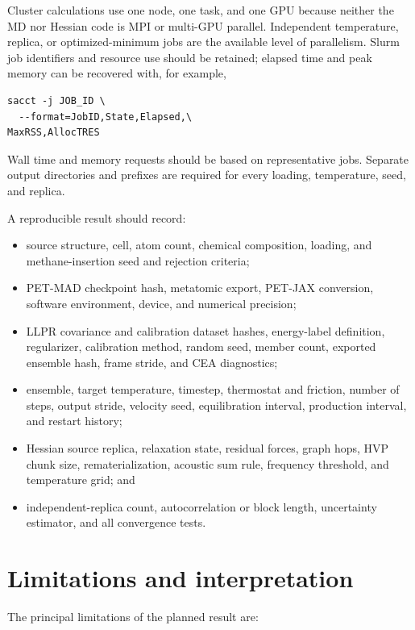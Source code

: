 \documentclass[10pt,a4paper,twocolumn]{article}
\begin{document}
Cluster calculations use one node, one task, and one GPU because neither the MD
nor Hessian code is MPI or multi-GPU parallel. Independent temperature,
replica, or optimized-minimum jobs are the available level of parallelism.
Slurm job identifiers and resource use should be retained; elapsed time and peak
memory can be recovered with, for example,
\begin{verbatim}
sacct -j JOB_ID \
  --format=JobID,State,Elapsed,\
MaxRSS,AllocTRES
\end{verbatim}
Wall time and memory requests should be based on representative jobs.
Separate output directories and
prefixes are required for every loading, temperature, seed, and replica.

A reproducible result should record:

\begin{itemize}
  \item source structure, cell, atom count, chemical composition, loading, and
        methane-insertion seed and rejection criteria;
  \item PET-MAD checkpoint hash, metatomic export, PET-JAX conversion, software
        environment, device, and numerical precision;
  \item LLPR covariance and calibration dataset hashes, energy-label
        definition, regularizer, calibration method, random seed, member
        count, exported ensemble hash, frame stride, and CEA diagnostics;
  \item ensemble, target temperature, timestep, thermostat and friction,
        number of steps, output stride, velocity seed, equilibration interval,
        production interval, and restart history;
  \item Hessian source replica, relaxation state, residual forces, graph hops,
        HVP chunk size, rematerialization, acoustic sum rule, frequency
        threshold, and temperature grid; and
  \item independent-replica count, autocorrelation or block length,
        uncertainty estimator, and all convergence tests.
\end{itemize}

\section{Limitations and interpretation}

The principal limitations of the planned result are:
\end{document}
